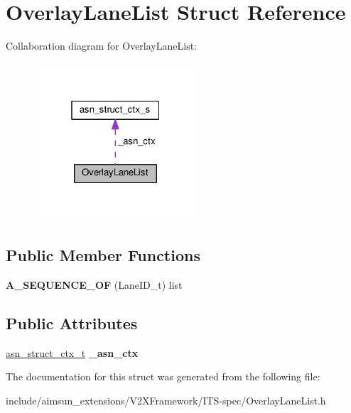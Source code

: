 \hypertarget{structOverlayLaneList}{}\section{Overlay\+Lane\+List Struct Reference}
\label{structOverlayLaneList}


Collaboration diagram for Overlay\+Lane\+List\+:\nopagebreak
\begin{figure}[H]
\begin{center}
\leavevmode
\includegraphics[width=172pt]{structOverlayLaneList__coll__graph}
\end{center}
\end{figure}
\subsection*{Public Member Functions}
\begin{DoxyCompactItemize}
\item 
{\bfseries A\+\_\+\+S\+E\+Q\+U\+E\+N\+C\+E\+\_\+\+OF} (Lane\+I\+D\+\_\+t) list\hypertarget{structOverlayLaneList_a02b748bcbdd96ac589761ee3446a34d0}{}\label{structOverlayLaneList_a02b748bcbdd96ac589761ee3446a34d0}

\end{DoxyCompactItemize}
\subsection*{Public Attributes}
\begin{DoxyCompactItemize}
\item 
\hyperlink{structasn__struct__ctx__s}{asn\+\_\+struct\+\_\+ctx\+\_\+t} {\bfseries \+\_\+asn\+\_\+ctx}\hypertarget{structOverlayLaneList_a733cf28138d08bcea9ccab9d007727e6}{}\label{structOverlayLaneList_a733cf28138d08bcea9ccab9d007727e6}

\end{DoxyCompactItemize}


The documentation for this struct was generated from the following file\+:\begin{DoxyCompactItemize}
\item 
include/aimsun\+\_\+extensions/\+V2\+X\+Framework/\+I\+T\+S-\/spec/Overlay\+Lane\+List.\+h\end{DoxyCompactItemize}
